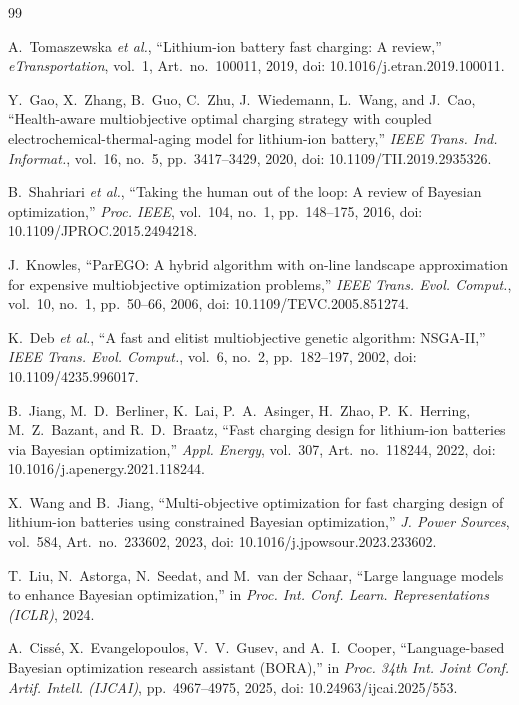 \documentclass[journal]{IEEEtran}
\begin{document}
\begin{thebibliography}{99}

A.~Tomaszewska \textit{et al.}, ``Lithium-ion battery fast charging: A
review,'' \textit{eTransportation}, vol.~1, Art.~no.~100011, 2019,
doi: 10.1016/j.etran.2019.100011.

Y.~Gao, X.~Zhang, B.~Guo, C.~Zhu, J.~Wiedemann, L.~Wang, and J.~Cao,
``Health-aware multiobjective optimal charging strategy with coupled
electrochemical-thermal-aging model for lithium-ion battery,''
\textit{IEEE Trans. Ind. Informat.}, vol.~16, no.~5, pp.~3417--3429, 2020,
doi: 10.1109/TII.2019.2935326.

B.~Shahriari \textit{et al.}, ``Taking the human out of the loop: A review of
Bayesian optimization,'' \textit{Proc. IEEE}, vol.~104, no.~1,
pp.~148--175, 2016, doi: 10.1109/JPROC.2015.2494218.

J.~Knowles, ``ParEGO: A hybrid algorithm with on-line landscape approximation
for expensive multiobjective optimization problems,''
\textit{IEEE Trans. Evol. Comput.}, vol.~10, no.~1, pp.~50--66, 2006,
doi: 10.1109/TEVC.2005.851274.

K.~Deb \textit{et al.}, ``A fast and elitist multiobjective genetic algorithm:
NSGA-II,'' \textit{IEEE Trans. Evol. Comput.}, vol.~6, no.~2,
pp.~182--197, 2002, doi: 10.1109/4235.996017.

B.~Jiang, M.~D.~Berliner, K.~Lai, P.~A.~Asinger, H.~Zhao, P.~K.~Herring,
M.~Z.~Bazant, and R.~D.~Braatz, ``Fast charging design for lithium-ion
batteries via Bayesian optimization,'' \textit{Appl. Energy}, vol.~307,
Art.~no.~118244, 2022, doi: 10.1016/j.apenergy.2021.118244.

X.~Wang and B.~Jiang, ``Multi-objective optimization for fast charging design
of lithium-ion batteries using constrained Bayesian optimization,''
\textit{J. Power Sources}, vol.~584, Art.~no.~233602, 2023,
doi: 10.1016/j.jpowsour.2023.233602.

T.~Liu, N.~Astorga, N.~Seedat, and M.~van der Schaar, ``Large language models
to enhance Bayesian optimization,'' in \textit{Proc. Int. Conf. Learn.
Representations (ICLR)}, 2024.

A.~Ciss\'e, X.~Evangelopoulos, V.~V.~Gusev, and A.~I.~Cooper,
``Language-based Bayesian optimization research assistant (BORA),'' in
\textit{Proc. 34th Int. Joint Conf. Artif. Intell. (IJCAI)},
pp.~4967--4975, 2025, doi: 10.24963/ijcai.2025/553.


\end{thebibliography}
\end{document}
